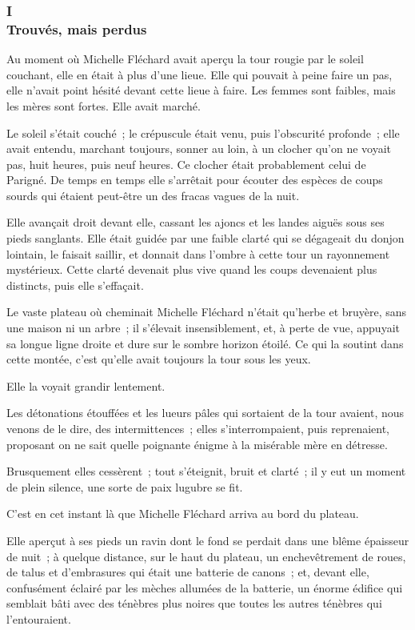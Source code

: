 \documentclass[french,twoside]{book} %
\begin{document}
\subsubsection[{I. Trouvés, mais perdus}]{I \\
Trouvés, mais perdus}
\label{p3l5c1}
\noindent Au moment où Michelle Fléchard avait aperçu la tour rougie par le soleil couchant, elle en était à plus d’une lieue. Elle qui pouvait à peine faire un pas, elle n’avait point hésité devant cette lieue à faire. Les femmes sont faibles, mais les mères sont fortes. Elle avait marché.\par
Le soleil s’était couché ; le crépuscule était venu, puis l’obscurité profonde ; elle avait entendu, marchant toujours, sonner au loin, à un clocher qu’on ne voyait pas, huit heures, puis neuf heures. Ce clocher était probablement celui de Parigné. De temps en temps elle s’arrêtait pour écouter des espèces de coups sourds qui étaient peut-être un des fracas vagues de la nuit.\par
 Elle avançait droit devant elle, cassant les ajoncs et les landes aiguës sous ses pieds sanglants. Elle était guidée par une faible clarté qui se dégageait du donjon lointain, le faisait saillir, et donnait dans l’ombre à cette tour un rayonnement mystérieux. Cette clarté devenait plus vive quand les coups devenaient plus distincts, puis elle s’effaçait.\par
Le vaste plateau où cheminait Michelle Fléchard n’était qu’herbe et bruyère, sans une maison ni un arbre ; il s’élevait insensiblement, et, à perte de vue, appuyait sa longue ligne droite et dure sur le sombre horizon étoilé. Ce qui la soutint dans cette montée, c’est qu’elle avait toujours la tour sous les yeux.\par
Elle la voyait grandir lentement.\par
Les détonations étouffées et les lueurs pâles qui sortaient de la tour avaient, nous venons de le dire, des intermittences ; elles s’interrompaient, puis reprenaient, proposant on ne sait quelle poignante énigme à la misérable mère en détresse.\par
Brusquement elles cessèrent ; tout s’éteignit, bruit et clarté ; il y eut un moment de plein silence, une sorte de paix lugubre se fit.\par
C’est en cet instant là que Michelle Fléchard arriva au bord du plateau.\par
Elle aperçut à ses pieds un ravin dont le fond se perdait dans une blême épaisseur de nuit ; à quelque distance, sur le haut du plateau, un enchevêtrement de roues, de talus et d’embrasures qui était une batterie de canons ; et, devant elle, confusément éclairé par les mèches allumées de la batterie, un énorme  édifice qui semblait bâti avec des ténèbres plus noires que toutes les autres ténèbres qui l’entouraient.\par
\end{document}
